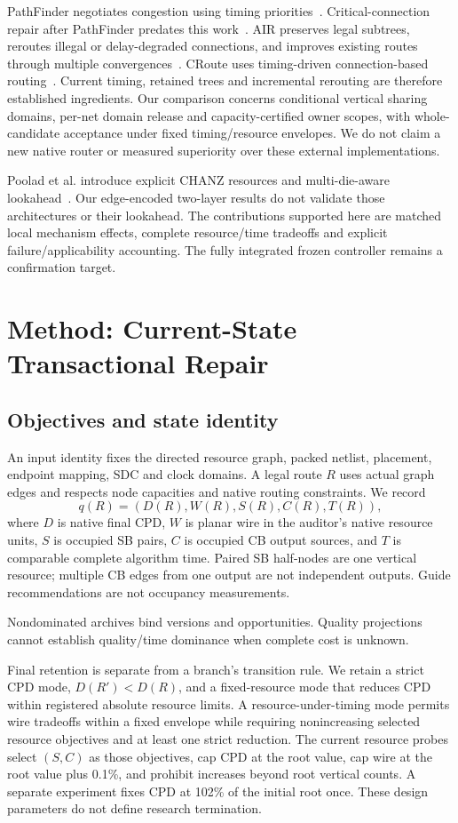 \documentclass[conference,10pt]{IEEEtran}
\begin{document}
PathFinder negotiates congestion using timing priorities~\cite{pathfinder}. Critical-connection repair after PathFinder predates this work~\cite{liurepair}. AIR preserves legal subtrees, reroutes illegal or delay-degraded connections, and improves existing routes through multiple convergences~\cite{air}. CRoute uses timing-driven connection-based routing~\cite{croute}. Current timing, retained trees and incremental rerouting are therefore established ingredients. Our comparison concerns conditional vertical sharing domains, per-net domain release and capacity-certified owner scopes, with whole-candidate acceptance under fixed timing/resource envelopes. We do not claim a new native router or measured superiority over these external implementations.

Poolad et al. introduce explicit CHANZ resources and multi-die-aware lookahead~\cite{multidie}. Our edge-encoded two-layer results do not validate those architectures or their lookahead. The contributions supported here are matched local mechanism effects, complete resource/time tradeoffs and explicit failure/applicability accounting. The fully integrated frozen controller remains a confirmation target.
\section{Method: Current-State Transactional Repair}
\subsection{Objectives and state identity}
An input identity fixes the directed resource graph, packed netlist, placement, endpoint mapping, SDC and clock domains. A legal route $R$ uses actual graph edges and respects node capacities and native routing constraints. We record
\begin{equation}
 q(R)=(D(R),W(R),S(R),C(R),T(R)),
\end{equation}
where $D$ is native final CPD, $W$ is planar wire in the auditor's native resource units, $S$ is occupied SB pairs, $C$ is occupied CB output sources, and $T$ is comparable complete algorithm time. Paired SB half-nodes are one vertical resource; multiple CB edges from one output are not independent outputs. Guide recommendations are not occupancy measurements.

Nondominated archives bind versions and opportunities. Quality projections cannot establish quality/time dominance when complete cost is unknown.

Final retention is separate from a branch's transition rule. We retain a strict CPD mode, $D(R')<D(R)$, and a fixed-resource mode that reduces CPD within registered absolute resource limits. A resource-under-timing mode permits wire tradeoffs within a fixed envelope while requiring nonincreasing selected resource objectives and at least one strict reduction. The current resource probes select $(S,C)$ as those objectives, cap CPD at the root value, cap wire at the root value plus 0.1\%, and prohibit increases beyond root vertical counts. A separate experiment fixes CPD at 102\% of the initial root once. These design parameters do not define research termination.
\end{document}
